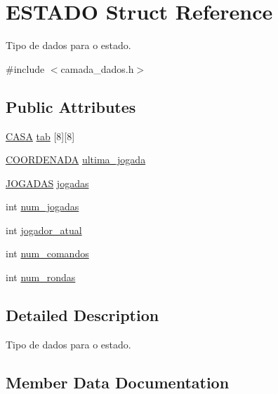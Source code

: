 \hypertarget{struct_e_s_t_a_d_o}{}\section{E\+S\+T\+A\+DO Struct Reference}
\label{struct_e_s_t_a_d_o}


Tipo de dados para o estado.  




{\ttfamily \#include $<$camada\+\_\+dados.\+h$>$}

\subsection*{Public Attributes}
\begin{DoxyCompactItemize}
\item 
\hyperlink{camada__dados_8h_aba91601f16d4c485b2d9b8c429f27039}{C\+A\+SA} \hyperlink{struct_e_s_t_a_d_o_ab56f0f1be16954d3768b4174d14c087d}{tab} \mbox{[}8\mbox{]}\mbox{[}8\mbox{]}
\item 
\hyperlink{struct_c_o_o_r_d_e_n_a_d_a}{C\+O\+O\+R\+D\+E\+N\+A\+DA} \hyperlink{struct_e_s_t_a_d_o_a4896a5c5c1f40b43fb795623327e3f47}{ultima\+\_\+jogada}
\item 
\hyperlink{camada__dados_8h_a94c221d29a1760f008b7834093259b7d}{J\+O\+G\+A\+D\+AS} \hyperlink{struct_e_s_t_a_d_o_afae43b87a488fad0f2b56a18bad31d18}{jogadas}
\item 
int \hyperlink{struct_e_s_t_a_d_o_a261495728744647e618b4e623f5a4b7a}{num\+\_\+jogadas}
\item 
int \hyperlink{struct_e_s_t_a_d_o_a5dd28e2e68b7aef2b6b7ea88e02eff58}{jogador\+\_\+atual}
\item 
int \hyperlink{struct_e_s_t_a_d_o_abe6faacdd6111160bf9a354f44b95b38}{num\+\_\+comandos}
\item 
int \hyperlink{struct_e_s_t_a_d_o_a3c616151db017f5b7af855a624fbb47c}{num\+\_\+rondas}
\end{DoxyCompactItemize}


\subsection{Detailed Description}
Tipo de dados para o estado. 

\subsection{Member Data Documentation}
\mbox{\label{struct_e_s_t_a_d_o_afae43b87a488fad0f2b56a18bad31d18}} 
